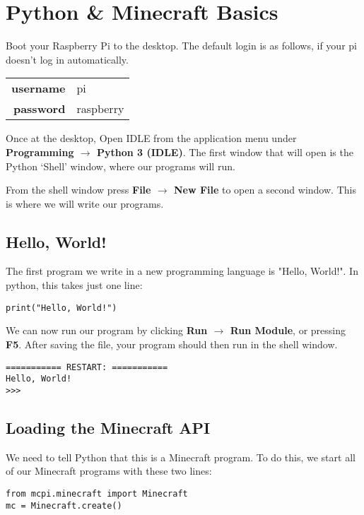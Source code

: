 \section{Python \& Minecraft Basics}

	Boot your Raspberry Pi to the desktop. The default login is as follows, if your pi doesn't log in automatically.
	
	\begin{tabular}{rl}
		\textbf{username} & pi \\ 
		\textbf{password} & raspberry
	\end{tabular} 
	
	Once at the desktop, Open IDLE from the application menu under \textbf{Programming $\rightarrow$ Python 3 (IDLE)}. The first window that will open is the Python `Shell' window, where our programs will run.
	
	From the shell window press \textbf{File $\rightarrow$ New File} to open a second window. This is where we will write our programs.
	
	\subsection*{Hello, World!}
	
		The first program we write in a new programming language is "Hello, World!". In python, this takes just one line:
		
		\begin{lstlisting}[style=Python, title=helloworld.py]
print("Hello, World!")
		\end{lstlisting}
		
		We can now run our program by clicking \textbf{Run $\rightarrow$ Run Module}, or pressing \textbf{F5}. After saving the file, your program should then run in the shell window.
		
		\begin{lstlisting}[style=Terminal, numbers=none]
=========== RESTART: ===========
Hello, World!
>>> 
		\end{lstlisting}
	
	\pagebreak[1]
	\subsection*{Loading the Minecraft API}
	
		We need to tell Python that this is a Minecraft program. To do this, we start all of our Minecraft programs with these two lines:
	
		\begin{lstlisting}[style=Python, title=hellominecraft.py]
from mcpi.minecraft import Minecraft
mc = Minecraft.create()
		\end{lstlisting}
	
